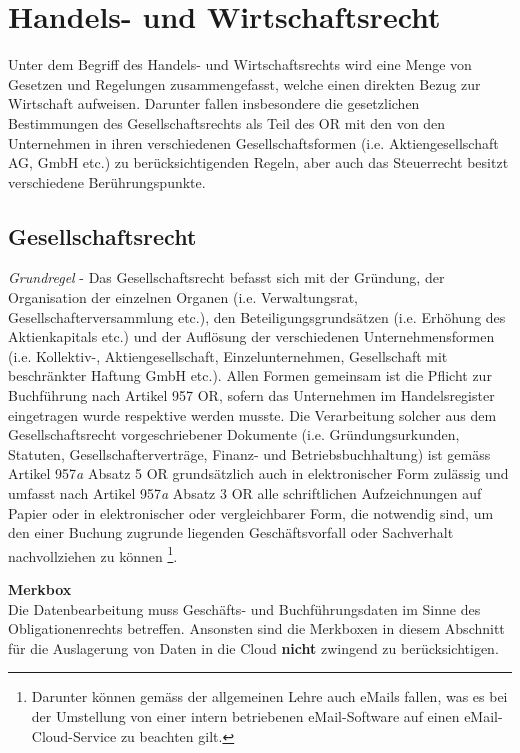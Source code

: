\documentclass[a4paper,pointlessnumbers]{scrreprt}
\newcommand{\merkbox}[2][0.8\textwidth]{ \begin{center} \begin{tcolorbox}[enhanced, drop fuzzy midday shadow, width={#1}, opacityframe=0.5, colframe=BrickRed, colback=white] {\ECFTeenSpirit \color{BrickRed}\textbf{Merkbox} \qquad {\tiny das gilt es zu beachten}} \\  #2 \end{tcolorbox} \end{center}}
\begin{document}
\pagebreak

\section{Handels- und Wirtschaftsrecht}
Unter dem Begriff des Handels- und Wirtschaftsrechts wird eine Menge von Gesetzen und Regelungen zusammengefasst, welche einen direkten Bezug zur Wirtschaft aufweisen. Darunter fallen insbesondere die gesetzlichen Bestimmungen des Gesellschaftsrechts als Teil des OR mit den von den Unternehmen in ihren verschiedenen Gesellschaftsformen (i.e. Aktiengesellschaft AG, GmbH etc.) zu berücksichtigenden Regeln, aber auch das Steuerrecht besitzt verschiedene Berührungspunkte.

\subsection{Gesellschaftsrecht}
\textit{Grundregel} - Das Gesellschaftsrecht befasst sich mit der Gründung, der Organisation der einzelnen Organen (i.e. Verwaltungsrat, Gesellschafterversammlung etc.), den Beteiligungsgrundsätzen (i.e. Erhöhung des Aktienkapitals etc.) und der Auflösung der verschiedenen Unternehmensformen (i.e. Kollektiv-, Aktiengesellschaft, Einzelunternehmen, Gesellschaft mit beschränkter Haftung GmbH etc.). Allen Formen gemeinsam ist die Pflicht zur Buchführung nach Artikel 957 OR, sofern das Unternehmen im Handelsregister eingetragen wurde respektive werden musste. Die Verarbeitung solcher aus dem Gesellschaftsrecht vorgeschriebener Dokumente (i.e. Gründungsurkunden, Statuten, Gesellschafterverträge, Finanz- und Betriebsbuchhaltung) ist gemäss Artikel 957\textit{a} Absatz 5 OR grundsätzlich auch in elektronischer Form zulässig und umfasst nach Artikel 957\textit{a} Absatz 3 OR alle schriftlichen Aufzeichnungen auf Papier oder in elektronischer oder vergleichbarer Form, die notwendig sind, um den einer Buchung zugrunde liegenden Geschäftsvorfall oder Sachverhalt nachvollziehen zu können \footnote{Darunter können gemäss der allgemeinen Lehre auch eMails fallen, was es bei der Umstellung von einer intern betriebenen eMail-Software auf einen eMail-Cloud-Service zu beachten gilt.}.

\merkbox[0.7\textwidth]{Die Datenbearbeitung muss Geschäfts- und Buchführungsdaten im Sinne des Obligationenrechts betreffen. Ansonsten sind die Merkboxen in diesem Abschnitt für die Auslagerung von Daten in die Cloud \textbf{nicht} zwingend zu berücksichtigen.}
\end{document}
